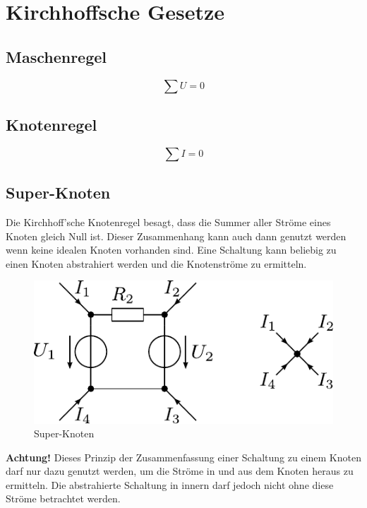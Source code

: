 



\section{Kirchhoffsche Gesetze}

\subsection{Maschenregel}
\[ \sum U = 0 \]

\subsection{Knotenregel}
\[ \sum I = 0 \]

\subsection{Super-Knoten}
Die Kirchhoff'sche Knotenregel besagt, dass die Summer aller Ströme eines Knoten gleich Null ist.
Dieser Zusammenhang kann auch dann genutzt werden wenn keine idealen Knoten vorhanden sind.
Eine Schaltung kann beliebig zu einen Knoten abstrahiert werden und die Knotenströme zu ermitteln.

\begin{figure}[h!]
\centering
\includegraphics[scale=\schscale]{supernode_sch.pdf}
\caption{Super-Knoten}
\label{sch:supernode}
\end{figure}

\noindent
\textbf{Achtung!} Dieses Prinzip der Zusammenfassung einer Schaltung zu einem Knoten darf nur dazu genutzt werden, um die Ströme in und aus dem Knoten heraus zu ermitteln. Die abstrahierte Schaltung in innern darf jedoch nicht ohne diese Ströme betrachtet werden. 
